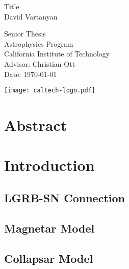 \documentclass{article}
\begin{document}
\thispagestyle{empty}
\vspace*{3 cm}
\begin{center}
\Huge
Title\\
\LARGE
\vspace{2 cm}
David Vartanyan\\
\vspace{2cm}

Senior Thesis\\
Astrophysics Program\\
California Institute of Technology\\

\vspace{5 cm}
\large
Advisor: Christian Ott\\
Date: \today
\end{center}
\centerline{\texttt{[image: caltech-logo.pdf]}}

\newpage
\thispagestyle{empty}
\mbox{}

\newpage
{\centering\section*{Abstract}}
\setcounter{page}{1}

\newpage
\thispagestyle{empty}
\mbox{}
\newpage

{\centering\tableofcontents}
\setcounter{page}{1}
\newpage
\thispagestyle{empty}
\mbox{}
\newpage

\section{Introduction}

\subsection{LGRB-SN Connection}

\subsection{Magnetar Model}

\subsection{Collapsar Model}
\end{document}

